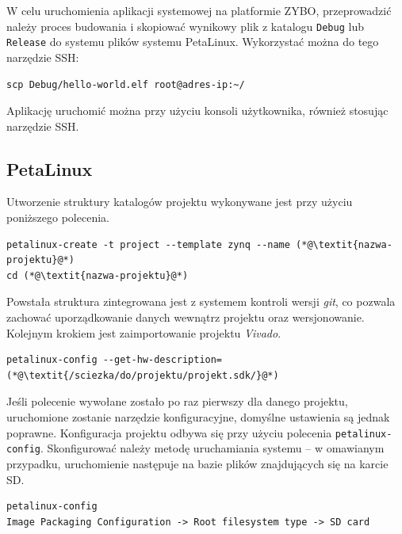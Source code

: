 W celu uruchomienia aplikacji systemowej na platformie ZYBO, przeprowadzić należy proces budowania i skopiować wynikowy plik z katalogu \texttt{Debug} lub \texttt{Release} do systemu plików systemu PetaLinux. 
Wykorzystać można do tego narzędzie SSH:

\begin{lstlisting}[breaklines=true]
scp Debug/hello-world.elf root@adres-ip:~/
\end{lstlisting}

Aplikację uruchomić można przy użyciu konsoli użytkownika, również stosując narzędzie SSH.

\subsection{PetaLinux}
\label{sec:petalinux-config}


Utworzenie struktury katalogów projektu wykonywane jest przy użyciu poniższego polecenia.

\begin{lstlisting}[breaklines=true]
petalinux-create -t project --template zynq --name (*@\textit{nazwa-projektu}@*)
cd (*@\textit{nazwa-projektu}@*)
\end{lstlisting}

Powstała struktura zintegrowana jest z systemem kontroli wersji \emph{git}, co pozwala zachować uporządkowanie danych wewnątrz projektu oraz wersjonowanie. 
Kolejnym krokiem jest zaimportowanie projektu \emph{Vivado}.

\begin{lstlisting}[breaklines=true]
petalinux-config --get-hw-description=(*@\textit{/sciezka/do/projektu/projekt.sdk/}@*)
\end{lstlisting}

Jeśli polecenie wywołane zostało po raz pierwszy dla danego projektu, uruchomione zostanie narzędzie konfiguracyjne, domyślne ustawienia są jednak poprawne.
Konfiguracja projektu odbywa się przy użyciu polecenia \texttt{petalinux-config}.
Skonfigurować należy metodę uruchamiania systemu -- w omawianym przypadku, uruchomienie następuje na bazie plików znajdujących się na karcie SD.
\begin{lstlisting}[breaklines=true]
petalinux-config
Image Packaging Configuration -> Root filesystem type -> SD card
\end{lstlisting}

